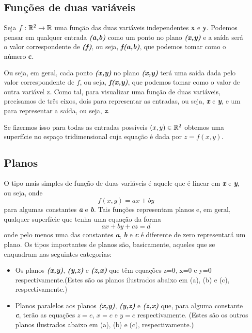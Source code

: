 \documentclass[a4paper]{article}
\begin{document}
\subsection*{Funções de duas variáveis}
\par Seja $f:\mathbb{R\textsuperscript{2}}\to\mathbb{R}$ uma função das duas variáveis independentes \textbf{x} e \textbf{y}. Podemos pensar em qualquer entrada \textit{\textbf{(a,b)}} como um ponto no plano \textit{\textbf{(x,y)}} e a saída será o valor correspondente de \textit{\textbf{(f)}}, ou seja, \textit{\textbf{f(a,b)}}, que podemos tomar como o número \textbf{c}.
\par Ou seja, em geral, cada ponto \textit{\textbf{(x,y)}} no plano \textit{\textbf{(x,y)}} terá uma saída dada pelo valor correspondente de $f$, ou seja, \textit{\textbf{f(x,y)}}, que podemos tomar como o valor de outra variável z. Como tal, para visualizar uma função de duas variáveis, precisamos de três eixos, dois para representar as entradas, ou seja, \textit{\textbf{x}} e \textit{\textbf{y}}, e um para representar a saída, ou seja, \textit{\textbf{z}}.
\par Se fizermos isso para todas as entradas possíveis \textit{\textbf{$(x,y)\in\mathbb{R}\textsuperscript{2}$}} obtemos uma superfície no espaço tridimensional cuja equação é dada por \textit{\textbf{$z = f(x,y)$}}.
\subsection*{Planos}
\par O tipo mais simples de função de duas variáveis é aquele que é linear em \textit{\textbf{x}} e \textit{\textbf{y}}, ou seja, onde
    \begin{equation}
        f(x,y) = ax + by
    \end{equation}
para algumas constantes \textit{\textbf{a}} e \textit{\textbf{b}}. Tais funções representam planos e, em geral, qualquer superfície que tenha uma equação da forma
    \begin{equation}
        ax + by + cz = d
    \end{equation}
onde pelo menos uma das constantes \textit{\textbf{a}}, \textit{\textbf{b}} e \textit{\textbf{c}} é diferente de zero representará um plano. Os tipos importantes de planos são, basicamente, aqueles que se enquadram nas seguintes categorias:
\begin{itemize}
    \item Os planos \textit{\textbf{(x,y)}}, \textit{\textbf{(y,z)}} e \textit{\textbf{(z,x)}} que têm equações z=0, x=0 e y=0 respectivamente.(Estes são os planos ilustrados abaixo em (a), (b) e (c), respectivamente.)
    \item Planos paralelos aos planos \textit{\textbf{(x,y)}}, \textit{\textbf{(y,z)}} e \textit{\textbf{(z,x)}} que, para alguma constante \textit{\textbf{c}}, terão as equações $z = c$, $x = c$ e $y = c$ respectivamente. (Estes são os outros planos ilustrados abaixo em (a), (b) e (c), respectivamente.)
\end{itemize}
\end{document}
